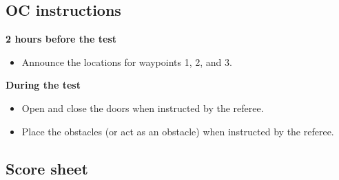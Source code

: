 \subsection{OC instructions}

\textbf{2 hours before the test}
\begin{itemize}
	\item Announce the locations for waypoints 1, 2, and 3.
\end{itemize}

\textbf{During the test}
\begin{itemize}
	\item Open and close the doors when instructed by the referee.
	\item Place the obstacles (or act as an obstacle) when instructed by the referee.
\end{itemize}

\newpage

\subsection{Score sheet}


